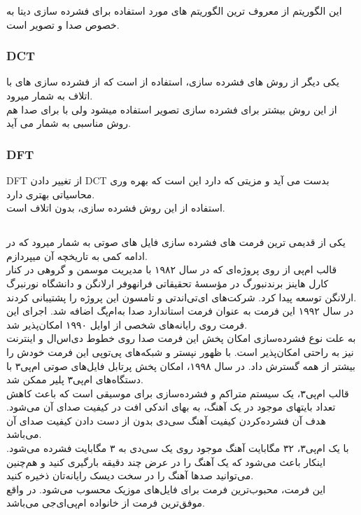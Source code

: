 این الگوریتم از معروف ترین الگوریتم های مورد استفاده برای فشرده سازی دیتا به خصوص صدا و تصویر است.

\subsubsection{DCT}
یکی دیگر از روش های فشرده سازی، استفاده از 
است که از فشرده سازی های با اتلاف به شمار میرود.
\\
از این روش بیشتر برای فشرده سازی تصویر استفاده میشود ولی با برای صدا هم روش مناسبی به شمار می آید.

\subsubsection{DFT}
DFT 
از تغییر دادن 
DCT 
بدست می آید و مزیتی که دارد این است که بهره وری محاسیاتی بهتری دارد.
\\
استفاده از این روش فشرده سازی، بدون اتلاف است.

\subsection{}
یکی از قدیمی ترین فرمت های فشرده سازی فایل های صوتی به شمار میرود که در ادامه کمی به تاریخچه آن میپردازم.
\\
قالب ام‌پی از روی پروژه‌ای که در سال ۱۹۸۲ با مدیریت موسمن و گروهی در کنار کارل هاینز برندنبورگ در مؤسسهٔ تحقیقاتی فرانهوفر ارلانگن و دانشگاه نورنبرگ ارلانگن توسعه پیدا کرد. شرکت‌های ای‌تی‌اندتی و تامسون این پروژه را پشتیبانی کردند.
\\
در سال ۱۹۹۲ این فرمت به عنوان فرمت استاندارد صدا به‌ام‌پگ اضافه شد. اجرای این فرمت روی رایانه‌های شخصی از اوایل ۱۹۹۰ امکان‌پذیر شد.
\\
به علت نوع فشرده‌سازی امکان پخش این فرمت صدا روی خطوط دی‌اس‌ال و اینترنت نیز به راحتی امکان‌پذیر است. با ظهور نپستر و شبکه‌های پی‌توپی این فرمت خودش را بیشتر از همه گسترش داد. در سال ۱۹۹۸، امکان پخش پرتابل فایل‌های صوتی ام‌پی۳ با دستگاه‌های ام‌پی۳ پلیر ممکن شد.
\\
قالب ام‌پی۳، یک سیستم متراکم و فشرده‌سازی برای موسیقی است که باعث کاهش تعداد بایتهای موجود در یک آهنگ، به بهای اندکی افت در کیفیت صدای آن می‌شود. هدف آن فشرده‌کردن کیفیت آهنگ سی‌دی بدون از دست دادن کیفیت صدای آن می‌باشد.
\\
با یک ام‌پی۳، ۳۲ مگابایت آهنگ موجود روی یک سی‌دی به ۳ مگابایت فشرده می‌شود. اینکار باعث می‌شود که یک آهنگ را در عرض چند دقیقه بارگیری کنید و هم‌چنین می‌توانید صدها آهنگ را در سخت دیسک رایانه‌تان ذخیره کنید.
\\
این فرمت، محبوب‌ترین فرمت برای فایل‌های موزیک محسوب می‌شود. 
در واقع 
موفق‌ترین فرمت از خانواده ام‌پی‌ای‌جی می‌باشد.

